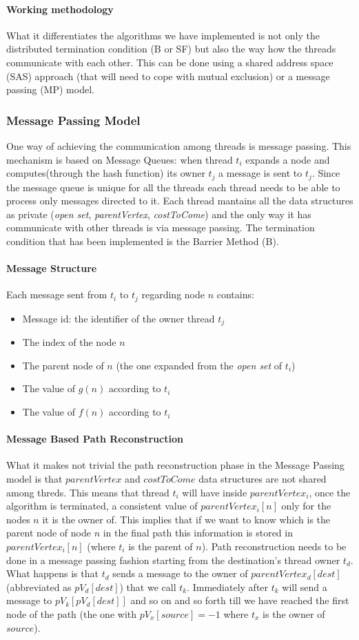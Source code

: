\documentclass[twocolumn, switch]{article} %
\begin{document}
\paragraph{Working methodology}
What it differentiates the algorithms we have implemented is not only
the distributed termination condition (B or SF) but also the way how the threads
communicate with each other. This can be done using a shared address space (SAS) approach (that will
need to cope with mutual exclusion) or a message passing (MP) model.
\subsubsection{Message Passing Model}
One way of achieving the communication among threads is message passing. This mechanism is based
on Message Queues: when thread $t_i$ expands a node and computes(through the hash function) 
its owner $t_j$ a message is sent to $t_j$. Since the message
queue is unique for all the threads each thread needs to be able to process
only messages directed to it. Each thread mantains all the data structures as private (\textit{open set},
\textit{parentVertex}, \textit{costToCome}) and the only way it has communicate with other threads
is via message passing. The termination condition that has been implemented is the Barrier Method (B).
\paragraph{Message Structure} Each message sent from $t_i$ to $t_j$ regarding node $n$ contains:
\begin{itemize}
  \item Message id: the identifier of the owner thread $t_j$
  \item The index of the node $n$
  \item The parent node of $n$ (the one expanded from the \textit{open set} of $t_i$)
  \item The value of $g(n)$ according to $t_i$
  \item The value of $f(n)$ according to $t_i$
\end{itemize}
\paragraph{Message Based Path Reconstruction}
What it makes not trivial the path reconstruction phase in the Message Passing model
is that $parentVertex$ and $costToCome$ data structures are not shared among threds. 
This means that thread $t_i$ will have inside $parentVertex_i$, once the algorithm is terminated, 
a consistent value of $parentVertex_i[n]$ only for the nodes $n$ it is the owner of. This implies that if
we want to know which is the parent node of node $n$ in the final path this information
is stored in $parentVertex_i[n]$ (where $t_i$ is the parent of $n$). Path reconstruction needs to be done in a message passing fashion starting
from the destination's thread owner $t_d$. What happens is that $t_d$ sends a message to
the owner of $parentVertex_d[dest]$ (abbreviated as $pV_d[dest]$) that we call $t_k$. Immediately after $t_k$ will send a message
to $pV_k[pV_d[dest]]$ and so on and so forth till we have reached the first node of the path (the one with $pV_x[source] = -1$ where
$t_x$ is the owner of $source$).
\end{document}
